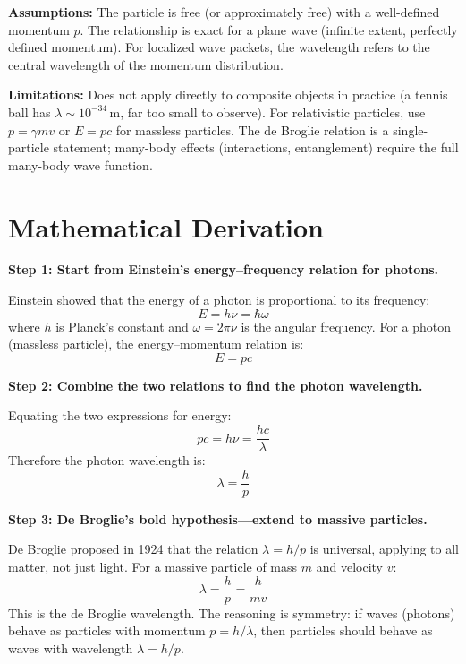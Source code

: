 \textbf{Assumptions:} The particle is free (or approximately free) with a well-defined momentum $p$. The relationship is exact for a plane wave (infinite extent, perfectly defined momentum). For localized wave packets, the wavelength refers to the central wavelength of the momentum distribution.


\textbf{Limitations:} Does not apply directly to composite objects in practice (a tennis ball has $\lambda \sim 10^{-34}\,\text{m}$, far too small to observe). For relativistic particles, use $p = \gamma mv$ or $E = pc$ for massless particles. The de Broglie relation is a single-particle statement; many-body effects (interactions, entanglement) require the full many-body wave function.


\section*{Mathematical Derivation}

\textbf{Step 1: Start from Einstein's energy--frequency relation for photons.}

Einstein showed that the energy of a photon is proportional to its frequency:
\begin{equation}
E = h\nu = \hbar\omega
\end{equation}
where $h$ is Planck's constant and $\omega = 2\pi\nu$ is the angular frequency. For a photon (massless particle), the energy--momentum relation is:
\begin{equation}
E = pc
\end{equation}

\textbf{Step 2: Combine the two relations to find the photon wavelength.}

Equating the two expressions for energy:
\begin{equation}
pc = h\nu = \frac{hc}{\lambda}
\end{equation}
Therefore the photon wavelength is:
\begin{equation}
\lambda = \frac{h}{p}
\end{equation}

\textbf{Step 3: De Broglie's bold hypothesis---extend to massive particles.}

De Broglie proposed in 1924 that the relation $\lambda = h/p$ is universal, applying to all matter, not just light. For a massive particle of mass $m$ and velocity $v$:
\begin{equation}
\lambda = \frac{h}{p} = \frac{h}{mv}
\end{equation}
This is the de Broglie wavelength. The reasoning is symmetry: if waves (photons) behave as particles with momentum $p = h/\lambda$, then particles should behave as waves with wavelength $\lambda = h/p$.

